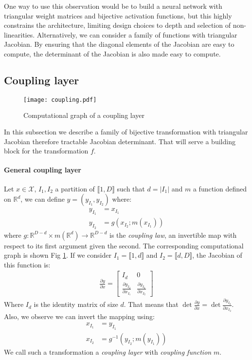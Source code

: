 \documentclass{article}
\newcommand {\RR} {\mathbb R}
\def\X{{\mathcal{X}}}
\begin{document}
One way to use this observation would be to build a neural network with triangular 
weight matrices and bijective activation functions, but this highly constrains
the architecture, limiting design choices to depth and selection of non-linearities.
Alternatively, we can consider a family of functions with triangular
Jacobian. By ensuring that the diagonal elements of the Jacobian are easy to compute,
the determinant of the Jacobian is also made easy to compute.

\subsection{Coupling layer}
\begin{figure}
    \centering \texttt{[image: coupling.pdf]}
    \caption{Computational graph of a coupling layer}
    \label{fig:coupling}
\end{figure}

In this subsection we describe a family of bijective transformation with triangular Jacobian therefore tractable Jacobian determinant. That will
serve a building block for the transformation $f$.

\paragraph*{General coupling layer}
Let $x \in \X$, $I_{1}, I_{2}$ a partition of $\llbracket 1, D \rrbracket$
such that $d = \lvert I_{1} \rvert$ and $m$ a function defined on
$\RR^{d}$, we can define $y = (y_{I_{1}}, y_{I_{2}})$ where:
\begin{align*}
y_{I_{1}} &= x_{I_{1}} \\
y_{I_{2}} &= g(x_{I_{2}} ; m(x_{I_{1}}))
\end{align*}
where
$g: \RR^{D-d} \times m(\RR^{d}) \rightarrow \RR^{D-d}$ is the \textit{coupling law},
an invertible map with respect to its first argument given the second. The
corresponding computational graph is shown Fig \ref{fig:coupling}. If we consider
$I_{1} = \llbracket 1, d \rrbracket$ and $I_{2} = \llbracket d, D \rrbracket$,
the Jacobian of this function is:
\begin{align*}
\frac{\partial y}{\partial x} =
\begin{bmatrix}
   I_{d} & 0 \\
   \frac{\partial y_{I_{2}}}{\partial x_{I_{1}}} & \frac{\partial y_{I_{2}}}{\partial x_{I_{2}}} 
\end{bmatrix}
\end{align*}
Where $I_{d}$ is the identity matrix of size $d$. That means that
$\det \frac{\partial y}{\partial x} = \det \frac{\partial y_{I_{2}}}{\partial x_{I_{2}}}$. 
Also, we observe we can invert the mapping using:
\begin{align*}
x_{I_{1}} &= y_{I_{1}} \\
x_{I_{2}} &= g^{-1}(y_{I_{2}} ; m(y_{I_{1}}))
\end{align*}
We call such a transformation a \textit{coupling layer} with
\textit{coupling function} $m$.  
\end{document}
